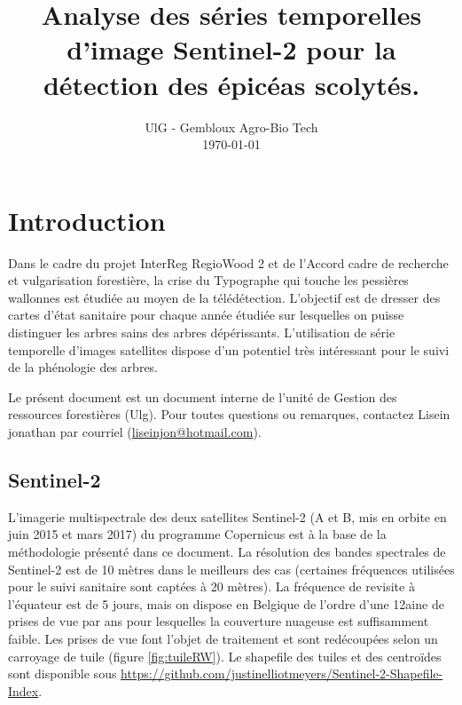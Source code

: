 \documentclass[a4paper, 12pt]{article} %
\title{Analyse des séries temporelles d'image Sentinel-2 pour la détection des épicéas scolytés.}
\date{%
    UlG - Gembloux Agro-Bio Tech
    \\
    \today
}
\begin{document}
\maketitle

\tableofcontents

\section{Introduction}

Dans le cadre du projet InterReg RegioWood 2 et de l'Accord cadre de recherche et vulgarisation forestière, la crise du Typographe qui touche les pessières wallonnes est étudiée au moyen de la télédétection. L'objectif est de dresser des cartes d'état sanitaire pour chaque année étudiée sur lesquelles on puisse distinguer les arbres sains des arbres dépérissants. L'utilisation de série temporelle d'images satellites dispose d'un potentiel très intéressant pour le suivi de la phénologie des arbres.

Le présent document est un document interne de l'unité de Gestion des ressources forestières (Ulg). Pour toutes questions ou remarques, contactez Lisein jonathan par courriel (\href{mailto:liseinjon@hotmail.com}{liseinjon@hotmail.com}).

\subsection{Sentinel-2}

L'imagerie multispectrale des deux satellites Sentinel-2 (A et B, mis en orbite en juin 2015 et mars 2017) du programme Copernicus est à la base de la méthodologie présenté dans ce document. La résolution des bandes spectrales de Sentinel-2 est de 10 mètres dans le meilleurs des cas (certaines fréquences utilisées pour le suivi sanitaire sont captées à 20 mètres). La fréquence de revisite à l'équateur est de 5 jours, mais on dispose en Belgique de l'ordre d'une 12aine de prises de vue par ans pour lesquelles la couverture nuageuse est suffisamment faible. Les prises de vue font l'objet de traitement et sont redécoupées selon un carroyage de tuile (figure \ref{fig:tuileRW}). Le shapefile des tuiles et des centroïdes sont disponible sous \url{https://github.com/justinelliotmeyers/Sentinel-2-Shapefile-Index}.
\end{document}
